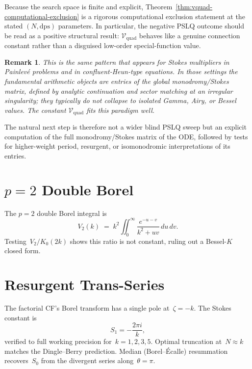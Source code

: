 \documentclass[11pt,a4paper]{article}
\newtheorem{remark}[theorem]{Remark}
\begin{document}
Because the search space is finite and explicit,
Theorem~\ref{thm:vquad-computational-exclusion} is a rigorous
computational exclusion statement at the stated $(N,\mathrm{dps})$
parameters. In particular, the negative PSLQ outcome should be read as a
positive structural result: $\mathcal{V}_{\mathrm{quad}}$ behaves like a genuine
connection constant rather than a disguised low-order special-function
value.

\begin{remark}\label{rem:vquad-stokes-pattern}
This is the same pattern that appears for Stokes multipliers in
Painlev\'e problems and in confluent-Heun-type equations. In those
settings the fundamental arithmetic objects are entries of the global
monodromy/Stokes matrix, defined by analytic continuation and sector
matching at an irregular singularity; they typically do not collapse to
isolated Gamma, Airy, or Bessel values. The constant
$\mathcal{V}_{\mathrm{quad}}$ fits this paradigm well.
\end{remark}

The natural next step is therefore not a wider blind PSLQ sweep but an
explicit computation of the full monodromy/Stokes matrix of the ODE,
followed by tests for higher-weight period, resurgent, or isomonodromic
interpretations of its entries.



\section{\texorpdfstring{$p=2$}{p=2} Double Borel}\label{sec:double_borel}

The $p=2$ double Borel integral is
\[
  V_2(k) \;=\; k^2\iint_0^\infty \frac{e^{-u-v}}{k^2 + uv}\,du\,dv.
\]
Testing~$V_2/K_0(2k)$ shows this ratio is not constant, ruling out a Bessel-$K$ closed form.

\section{Resurgent Trans-Series}\label{sec:resurgence}

The factorial CF's Borel transform has a single pole at~$\zeta = -k$. The Stokes constant is
\[
  S_1 = -\frac{2\pi i}{k},
\]
verified to full working precision for~$k = 1, 2, 3, 5$. Optimal truncation at~$N \approx k$ matches the Dingle--Berry prediction. Median (Borel--\'Ecalle) resummation recovers~$S_0$ from the divergent series along~$\theta = \pi$.
\end{document}
